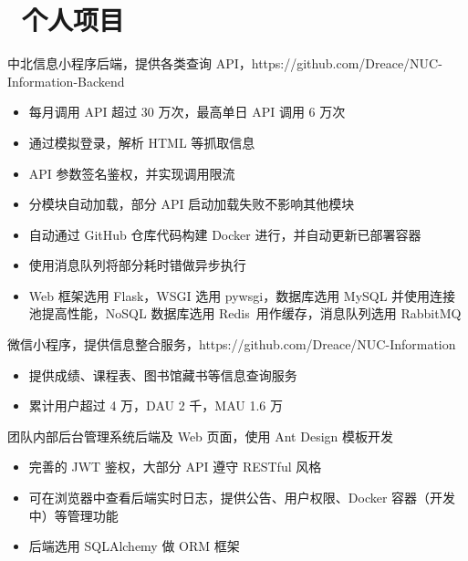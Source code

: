 \documentclass{resume}
\begin{document}
\section{\faUsers\ 个人项目}
\begin{onehalfspacing}
  中北信息小程序后端，提供各类查询 API，https://github.com/Dreace/NUC-Information-Backend
  \begin{itemize}
    \item 每月调用 API 超过 30 万次，最高单日 API 调用 6 万次
    \item 通过模拟登录，解析 HTML 等抓取信息
    \item API 参数签名鉴权，并实现调用限流
    \item 分模块自动加载，部分 API 启动加载失败不影响其他模块
    \item 自动通过 GitHub 仓库代码构建 Docker 进行，并自动更新已部署容器
    \item 使用消息队列将部分耗时错做异步执行
    \item Web 框架选用 Flask，WSGI 选用 pywsgi，数据库选用 MySQL 并使用连接池提高性能，NoSQL 数据库选用 Redis\
          用作缓存，消息队列选用 RabbitMQ
  \end{itemize}
\end{onehalfspacing}

\begin{onehalfspacing}
  微信小程序，提供信息整合服务，https://github.com/Dreace/NUC-Information
  \begin{itemize}
    \item 提供成绩、课程表、图书馆藏书等信息查询服务
    \item 累计用户超过 4 万，DAU 2 千，MAU 1.6 万
  \end{itemize}
\end{onehalfspacing}

\begin{onehalfspacing}
  团队内部后台管理系统后端及 Web 页面，使用 Ant Design 模板开发
  \begin{itemize}
    \item 完善的 JWT 鉴权，大部分 API 遵守 RESTful 风格
    \item 可在浏览器中查看后端实时日志，提供公告、用户权限、Docker 容器（开发中）等管理功能
    \item 后端选用 SQLAlchemy 做 ORM 框架
  \end{itemize}
\end{onehalfspacing}
\end{document}
